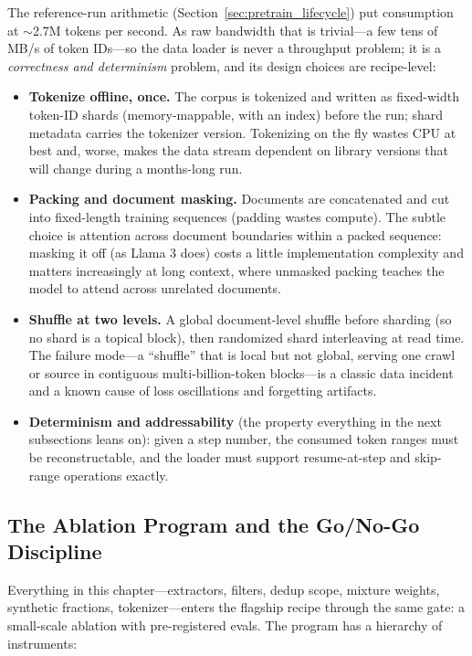 The reference-run arithmetic (Section~\ref{sec:pretrain_lifecycle}) put consumption at $\sim$2.7M tokens per second. As raw bandwidth that is trivial---a few tens of MB/s of token IDs---so the data loader is never a throughput problem; it is a \textit{correctness and determinism} problem, and its design choices are recipe-level:

\begin{itemize}
    \item \textbf{Tokenize offline, once.} The corpus is tokenized and written as fixed-width token-ID shards (memory-mappable, with an index) before the run; shard metadata carries the tokenizer version. Tokenizing on the fly wastes CPU at best and, worse, makes the data stream dependent on library versions that will change during a months-long run.
    \item \textbf{Packing and document masking.} Documents are concatenated and cut into fixed-length training sequences (padding wastes compute). The subtle choice is attention across document boundaries within a packed sequence: masking it off (as Llama 3 does) costs a little implementation complexity and matters increasingly at long context, where unmasked packing teaches the model to attend across unrelated documents.
    \item \textbf{Shuffle at two levels.} A global document-level shuffle before sharding (so no shard is a topical block), then randomized shard interleaving at read time. The failure mode---a ``shuffle'' that is local but not global, serving one crawl or source in contiguous multi-billion-token blocks---is a classic data incident and a known cause of loss oscillations and forgetting artifacts.
    \item \textbf{Determinism and addressability} (the property everything in the next subsections leans on): given a step number, the consumed token ranges must be reconstructable, and the loader must support resume-at-step and skip-range operations exactly.
\end{itemize}

\subsection{The Ablation Program and the Go/No-Go Discipline}

Everything in this chapter---extractors, filters, dedup scope, mixture weights, synthetic fractions, tokenizer---enters the flagship recipe through the same gate: a small-scale ablation with pre-registered evals. The program has a hierarchy of instruments:

